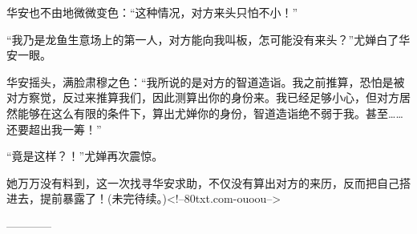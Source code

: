 \begin{this_body}
华安也不由地微微变色：“这种情况，对方来头只怕不小！”

“我乃是龙鱼生意场上的第一人，对方能向我叫板，怎可能没有来头？”尤婵白了华安一眼。

华安摇头，满脸肃穆之色：“我所说的是对方的智道造诣。我之前推算，恐怕是被对方察觉，反过来推算我们，因此测算出你的身份来。我已经足够小心，但对方居然能够在这么有限的条件下，算出尤婵你的身份，智道造诣绝不弱于我。甚至……还要超出我一筹！”

“竟是这样？！”尤婵再次震惊。

她万万没有料到，这一次找寻华安求助，不仅没有算出对方的来历，反而把自己搭进去，提前暴露了！(未完待续。)<!--80txt.com-ouoou-->

------------

\end{this_body}

